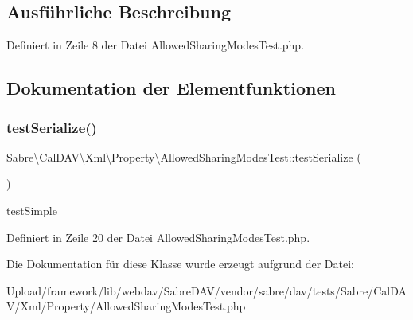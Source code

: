 \subsection{Ausführliche Beschreibung}


Definiert in Zeile 8 der Datei Allowed\+Sharing\+Modes\+Test.\+php.



\subsection{Dokumentation der Elementfunktionen}
\mbox{\label{class_sabre_1_1_cal_d_a_v_1_1_xml_1_1_property_1_1_allowed_sharing_modes_test_aa479c0198532492ecb45b13a6ba97ef5}} 
\subsubsection{\texorpdfstring{test\+Serialize()}{testSerialize()}}
{\footnotesize\ttfamily Sabre\textbackslash{}\+Cal\+D\+A\+V\textbackslash{}\+Xml\textbackslash{}\+Property\textbackslash{}\+Allowed\+Sharing\+Modes\+Test\+::test\+Serialize (\begin{DoxyParamCaption}{ }\end{DoxyParamCaption})}

test\+Simple 

Definiert in Zeile 20 der Datei Allowed\+Sharing\+Modes\+Test.\+php.



Die Dokumentation für diese Klasse wurde erzeugt aufgrund der Datei\+:\begin{DoxyCompactItemize}
\item 
Upload/framework/lib/webdav/\+Sabre\+D\+A\+V/vendor/sabre/dav/tests/\+Sabre/\+Cal\+D\+A\+V/\+Xml/\+Property/Allowed\+Sharing\+Modes\+Test.\+php\end{DoxyCompactItemize}
